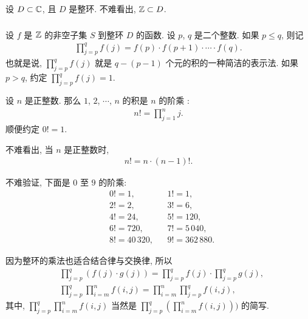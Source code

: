 \begin{example}
    设 $D \subset \mathbb{C}$, 且 $D$ 是整环. 不难看出, $\mathbb{Z} \subset D$.
\end{example}

\subsubsection*{\Products}

\begin{definition}
    设 $f$ 是 $\mathbb{Z}$ 的非空子集 $S$ 到整环 $D$ 的函数. 设 $p$, $q$ 是二个整数. 如果 $p \leq q$, 则记
    \begin{align*}
        \prod_{j = p}^{q} f(j) = f(p) \cdot f(p + 1) \cdot \cdots \cdot f(q).
    \end{align*}
    也就是说, $\prod_{j = p}^{q} f(j)$ 就是 $q - (p - 1)$ 个元的积的一种简洁的表示法. 如果 $p > q$, 约定 $\prod_{j = p}^{q} f(j) = 1$.
\end{definition}

\begin{definition}
    设 $n$ 是正整数. 那么 $1$, $2$, $\cdots$, $n$ 的积是 $n$ 的阶乘 :
    \begin{align*}
        n! = \prod_{j = 1}^{n} j.
    \end{align*}
    顺便约定 $0! = 1$.
\end{definition}

\begin{remark}
    不难看出, 当 $n$ 是正整数时,
    \begin{align*}
        n! = n \cdot (n-1)!.
    \end{align*}
\end{remark}

\begin{example}
    不难验证, 下面是 $0$ 至 $9$ 的阶乘:
    \begin{align*}
         & 0! = 1,       &  & 1! = 1,        \\
         & 2! = 2,       &  & 3! = 6,        \\
         & 4! = 24,      &  & 5! = 120,      \\
         & 6! = 720,     &  & 7! = 5\,040,   \\
         & 8! = 40\,320, &  & 9! = 362\,880.
    \end{align*}
\end{example}

\begin{remark}
    因为整环的乘法也适合结合律与交换律, 所以
    \begin{align*}
         & \prod_{j=p}^{q} (f(j) \cdot g(j)) = \prod_{j=p}^{q} f(j) \cdot \prod_{j=p}^{q} g(j), \\
         & \prod_{j=p}^{q} \prod_{i=m}^{n} f(i,j) = \prod_{i=m}^{n} \prod_{j=p}^{q} f(i,j),
    \end{align*}
    其中, $\prod_{j=p}^{q} \prod_{i=m}^{n} f(i,j)$ 当然是 $\prod_{j=p}^{q} \left( \prod_{i=m}^{n} f(i,j) \right))$ 的简写.
\end{remark}

